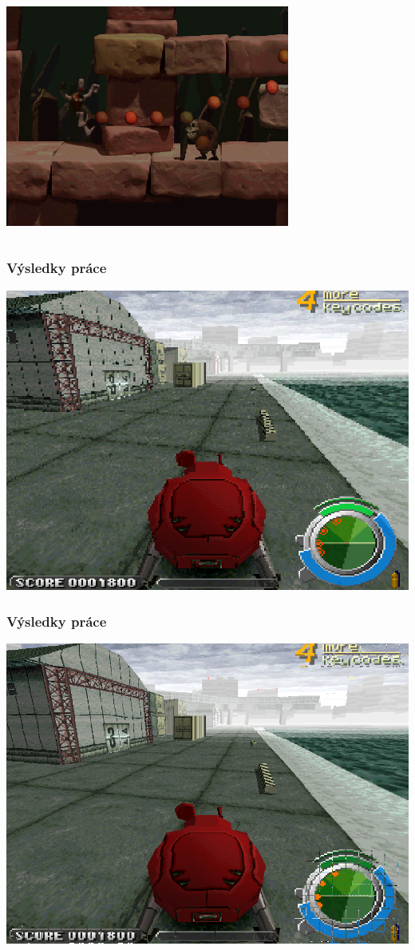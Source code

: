 \begin{frame}
\begin{columns}
    \bigskip
    \includegraphics[width=0.7\textwidth]{img/skullmonkeys-showcase-1-1.png}
    
  \end{columns}
\end{frame}

\begin{frame}
  \frametitle{Výsledky práce}
  \includegraphics[width=1\textwidth]{img/gits-lowres.png}
\end{frame}

\begin{frame}
  \frametitle{Výsledky práce}
  \includegraphics[width=1\textwidth]{img/gits-highres.png}
\end{frame}

